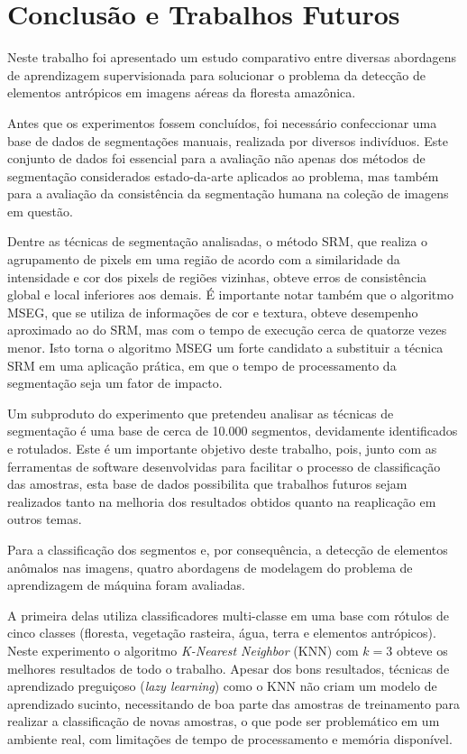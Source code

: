 \chapter{Conclusão e Trabalhos Futuros}\label{cap:conclusao}

Neste trabalho foi apresentado um estudo comparativo entre diversas abordagens de aprendizagem supervisionada para solucionar o problema da detecção de elementos antrópicos em imagens aéreas da floresta amazônica.

Antes que os experimentos fossem concluídos, foi necessário confeccionar uma base de dados de segmentações manuais, realizada por diversos indivíduos. Este conjunto de dados foi essencial para a avaliação não apenas dos métodos de segmentação considerados estado-da-arte aplicados ao problema, mas também para a avaliação da consistência da segmentação humana na coleção de imagens em questão.

Dentre as técnicas de segmentação analisadas, o método SRM, que realiza o agrupamento de pixels em uma região de acordo com a similaridade da intensidade e cor dos pixels de regiões vizinhas, obteve erros de consistência global e local inferiores aos demais. É importante notar também que o algoritmo MSEG, que se utiliza de informações de cor e textura, obteve desempenho aproximado ao do SRM, mas com o tempo de execução cerca de quatorze vezes menor. Isto torna o algoritmo MSEG um forte candidato a substituir a técnica SRM em uma aplicação prática, em que o tempo de processamento da segmentação seja um fator de impacto.

Um subproduto do experimento que pretendeu analisar as técnicas de segmentação é uma base de cerca de 10.000 segmentos, devidamente identificados e rotulados. Este é um importante objetivo deste trabalho, pois, junto com as ferramentas de software desenvolvidas para facilitar o processo de classificação das amostras, esta base de dados possibilita que trabalhos futuros sejam realizados tanto na melhoria dos resultados obtidos quanto na reaplicação em outros temas.

Para a classificação dos segmentos e, por consequência, a detecção de elementos anômalos nas imagens, quatro abordagens de modelagem do problema de aprendizagem de máquina foram avaliadas.

A primeira delas utiliza classificadores multi-classe em uma base com rótulos de cinco classes (floresta, vegetação rasteira, água, terra e elementos antrópicos). Neste experimento o algoritmo \textit{K-Nearest Neighbor} (KNN) com $k=3$ obteve os melhores resultados de todo o trabalho. Apesar dos bons resultados, técnicas de aprendizado preguiçoso (\textit{lazy learning}) como o KNN não criam um modelo de aprendizado sucinto, necessitando de boa parte das amostras de treinamento para realizar a classificação de novas amostras, o que pode ser problemático em um ambiente real, com limitações de tempo de processamento e memória disponível.

